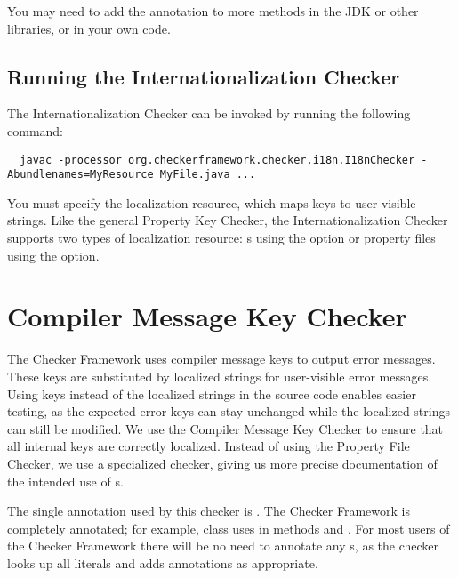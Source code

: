 You may need to add the  annotation to more methods in the
JDK or other libraries, or in your own code.


\subsection{Running the Internationalization Checker\label{i18n-running}}

The Internationalization Checker can be invoked by running the following
command:

\begin{Verbatim}
  javac -processor org.checkerframework.checker.i18n.I18nChecker -Abundlenames=MyResource MyFile.java ...
\end{Verbatim}

You must specify the localization resource, which maps keys to user-visible
strings.  Like the general Property Key Checker, the Internationalization Checker
supports two types of localization resource:
s using the 
 option
or property files using the
 option.



\section{Compiler Message Key Checker\label{compilermsgs-checker}}

The Checker Framework uses compiler message keys to output error messages.
These keys are substituted by localized strings for user-visible error messages.
Using keys instead of the localized strings in the source code enables easier
testing, as the expected error keys can stay unchanged while the localized
strings can still be modified. 
We use the Compiler Message Key Checker to ensure that all internal
keys are correctly localized.
Instead of using the Property File Checker, we use a specialized checker,
giving us more precise documentation of the intended use of s.

The single annotation used by this checker is 
.
The Checker Framework is completely annotated;
for example, class 
uses  in methods  and .
For most users of the Checker Framework there will be no need to annotate any
s, as the checker looks up all  literals and adds
annotations as appropriate.

